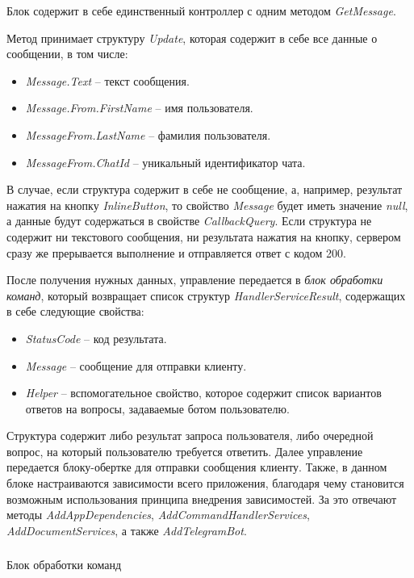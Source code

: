 Блок содержит в себе единственный контроллер с одним методом \emph{GetMessage}.

Метод принимает структуру \emph{Update}, которая содержит в себе все данные о сообщении, в том числе:

\begin{itemize}
	\item \emph{Message.Text} – текст сообщения.
	\item \emph{Message.From.FirstName} – имя пользователя.
	\item \emph{MessageFrom.LastName} – фамилия пользователя.
	\item \emph{MessageFrom.ChatId} – уникальный идентификатор чата.
\end{itemize}

В случае, если структура содержит в себе не сообщение, а, например, результат нажатия на кнопку \emph{InlineButton}, то свойство \emph{Message} будет иметь значение \emph{null}, а данные будут содержаться в свойстве \emph{CallbackQuery}.
Если структура не содержит ни текстового сообщения, ни результата нажатия на кнопку, сервером сразу же прерывается выполнение и отправляется ответ с кодом 200.

После получения нужных данных, управление передается в \emph{блок обработки команд}, который возвращает список структур \emph{HandlerServiceResult}, содержащих в себе следующие свойства:

\begin{itemize}
	\item \emph{StatusCode} – код результата.
	\item \emph{Message} – сообщение для отправки клиенту.
	\item \emph{Helper} – вспомогательное свойство, которое содержит список
вариантов ответов на вопросы, задаваемые ботом пользователю.
\end{itemize}

Структура содержит либо результат запроса пользователя, либо очередной вопрос, на который пользователю требуется ответить.
Далее управление передается блоку-обертке для отправки сообщения клиенту.
Также, в данном блоке настраиваются зависимости всего приложения, благодаря чему становится возможным использования принципа внедрения зависимостей. За это отвечают методы \emph{AddAppDependencies}, \emph{AddCommandHandlerServices}, \emph{AddDocumentServices}, а также \emph{AddTelegramBot}.

\subsubsection{} Блок обработки команд
\label{sec:design:server:framework}

